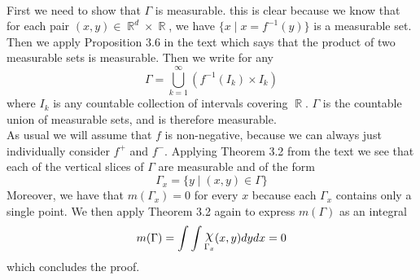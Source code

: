 \documentclass{article}
\DeclareMathOperator{\R}{\mathbb{R}}
\DeclareMathOperator{\capchi}{\raisebox{2pt}{$\mathlarger{\mathlarger{\chi}}$}}
\DeclareMathOperator{\suchthat}{\mathrel{|}}
\newcommand{\problem}[1]{\noindent{\textbf{Problem #1}}\\}
\begin{document}
\problem{2.5.7} First we need to show that $\Gamma$ is measurable. this is clear because we know that for each pair $(x,y) \in \R^d \times \R$, we have $\{x \suchthat x = f^{-1}(y)\}$ is a measurable set. Then we apply Proposition 3.6 in the text which says that the product of two measurable sets is measurable. Then we write for any 
\[
\Gamma = \bigcup_{k=1}^\infty (f^{-1}(I_k) \times I_k)
\]
where $I_k$ is any countable collection of intervals covering $\R$. $\Gamma$ is the countable union of measurable sets, and is therefore measurable. \\
\indent As usual we will assume that $f$ is non-negative, because we can always just individually consider $f^+$ and $f^{-}$. Applying Theorem 3.2 from the text we see that each of the vertical slices of $\Gamma$ are measurable and of the form
\[
\Gamma_x = \{y \suchthat (x,y) \in \Gamma\}
\]
Moreover, we have that $m(\Gamma_x) = 0$ for every $x$ because each $\Gamma_x$ contains only a single point. We then apply Theorem 3.2 again to express $m(\Gamma)$ as an integral
\[
m(\Gamma) = \int\int \capchi_{\Gamma_x}(x,y)dydx = 0
\]
which concludes the proof. 
\end{document}
